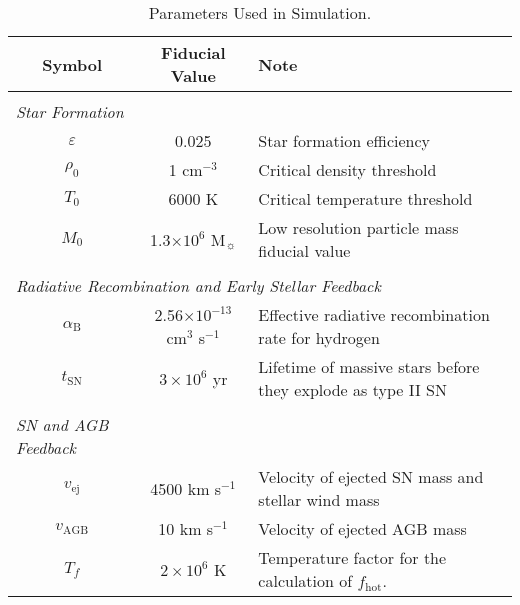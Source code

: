 \begin{table*}
\centering
\caption{Parameters Used in Simulation.}
\label{table:params}
\begin{threeparttable}
\begin{tabular}{c@{\ \ }c@{\ \ }l@{\ \ \ \ \ }}
\hline\hline
Symbol & Fiducial Value & Note \\
\hline
\\[-1.5mm]
\multicolumn{1}{l}{\it Star Formation} \\
$\varepsilon$ & 0.025 & Star formation efficiency \\
$\rho_0$ & 1 cm$^{-3}$ & Critical density threshold \\
$T_0$ & 6000 K & Critical temperature threshold \\
$M_0$ & 1.3$\times 10^6$ M$_{\sun}$ & Low resolution particle mass fiducial value \\
 \\
\multicolumn{3}{l}{\it Radiative Recombination and Early Stellar Feedback} \\
$\alpha_{\mathrm{B}}$ & 2.56$\times10^{-13}$ cm$^3$ s$^{-1}$ & Effective radiative recombination rate for hydrogen\\
$t_{\mathrm{SN}}$ & $3\times 10^6$ yr & Lifetime of massive stars before they explode as type II SN \\
 \\
\multicolumn{1}{l}{\it SN and AGB Feedback} \\
$v_{\mathrm{ej}}$ & 4500 km s$^{-1}$ & Velocity of ejected SN mass and stellar wind mass \\
$v_{\mathrm{AGB}}$ & 10 km s$^{-1}$ & Velocity of ejected AGB mass \\
$T_f$ &  $2\times10^6$ K & Temperature factor for the calculation of $f_{\mathrm{hot}}$. \\[0.05 in]
\hline\hline
\end{tabular}
\end{threeparttable}
\end{table*}